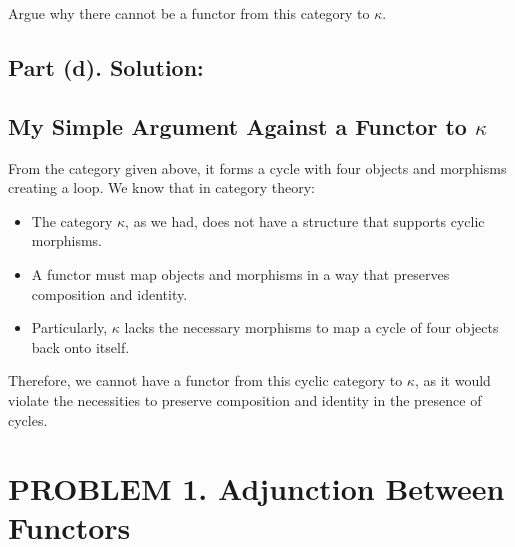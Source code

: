 \documentclass{article}
\begin{document}
Argue why there cannot be a functor from this category to $\kappa$.

\subsection*{Part (d). Solution:}


\subsection*{My Simple Argument Against a Functor to \(\kappa\)}

From the category given above, it forms a cycle with four objects and morphisms creating a loop. 
We know that in category theory:

\begin{itemize}    
    \item The category \(\kappa\), as we had, does not have a structure that supports cyclic morphisms.
    \item A functor must map objects and morphisms in a way that preserves composition and identity.
    \item Particularly, \(\kappa\) lacks the necessary morphisms to map a cycle of four objects back onto itself.
\end{itemize}

Therefore, we cannot have a functor from this cyclic category to \(\kappa\), 
as it would violate the necessities to preserve composition and identity in the presence of cycles.



\newpage

\section*{PROBLEM 1. Adjunction Between Functors  }
\end{document}
